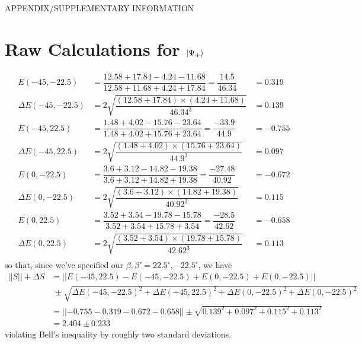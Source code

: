 \documentclass[aps,prl,nofootinbib,twocolumn,superscriptaddress,groupedaddress]{revtex4}  %
\begin{document}
\clearpage
\newpage
\appendix
\onecolumngrid
\begin{Large}
\begin{center}
APPENDIX/SUPPLEMENTARY INFORMATION
\end{center}
\end{Large}
\section{Raw Calculations for $\ket{\Psi_{+}}$}
\begin{align*}
E(-45, -22.5) &= \dfrac{12.58 + 17.84 - 4.24 - 11.68}{12.58 + 11.68 + 4.24 + 17.84} = \dfrac{14.5}{46.34} &= 0.319\\
\Delta E(-45, -22.5) &= 2\sqrt{\dfrac{(12.58 + 17.84)\times(4.24 + 11.68)}{46.34^{3}}} &= 0.139\\
E(-45, 22.5) &= \dfrac{1.48 + 4.02 - 15.76 - 23.64}{1.48 + 4.02 + 15.76 + 23.64} = \dfrac{-33.9}{44.9} &= -0.755\\
\Delta E(-45, 22.5) &= 2\sqrt{\dfrac{(1.48 + 4.02)\times(15.76 + 23.64)}{44.9^{3}}} &= 0.097\\
E(0,-22.5) &= \dfrac{3.6 + 3.12 - 14.82 - 19.38}{3.6 + 3.12 + 14.82 + 19.38} = \dfrac{-27.48}{40.92} &= -0.672\\
\Delta E(0, -22.5) &= 2\sqrt{\dfrac{(3.6 + 3.12)\times(14.82 + 19.38)}{40.92^{3}}} &= 0.115\\
E(0,22.5) &= \dfrac{3.52 + 3.54 - 19.78 - 15.78}{3.52 + 3.54 + 15.78 + 3.54} = \dfrac{-28.5}{42.62} &= -0.658\\
\Delta E(0,22.5) &= 2\sqrt{\dfrac{(3.52 + 3.54)\times(19.78 + 15.78)}{42.62^{3}}} &= 0.113\\
\end{align*}
\noindent so that, since we've specified our $\beta,\beta' = 22.5^{\circ}, -22.5^{\circ}$, we have
\begin{align*}
\lvert| S \rvert| + \Delta S &= \lvert|E(-45, 22.5) - E(-45, -22.5) + E(0,-22.5) + E(0,-22.5)\rvert|\\
&\;\pm \sqrt{\Delta E(-45, -22.5)^{2} + \Delta E(-45, 22.5)^{2} + \Delta E(0,-22.5)^{2} + \Delta E(0,-22.5)^{2}}\\
&= \lvert|-0.755 - 0.319 - 0.672 - 0.658 \rvert| \pm \sqrt{0.139^{2} + 0.097^{2} + 0.115^{2} + 0.113^{2}}\\
&= 2.404 \pm 0.233
\end{align*}
\noindent violating Bell's inequality by roughly two standard deviations.
\end{document}

